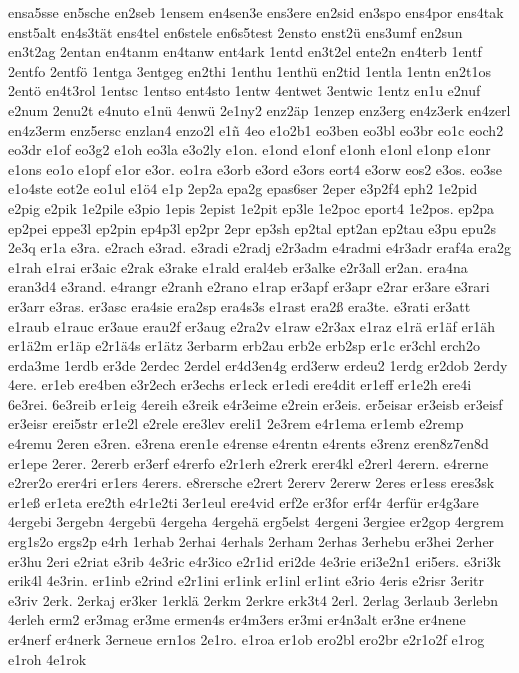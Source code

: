 {ensa5sse
en5sche
en2seb
1ensem
en4sen3e
ens3ere
en2sid
en3spo
ens4por
ens4tak
enst5alt
en4s3tät
ens4tel
en6stele
en6s5test
2ensto
enst2ü
ens3umf
en2sun
en3t2ag
2entan
en4tanm
en4tanw
ent4ark
1entd
en3t2el
ente2n
en4terb
1entf
2entfo
2entfö
1entga
3entgeg
en2thi
1enthu
1enthü
en2tid
1entla
1entn
en2t1os
2entö
en4t3rol
1entsc
1entso
ent4sto
1entw
4entwet
3entwic
1entz
en1u
e2nuf
e2num
2enu2t
e4nuto
e1nü
4enwü
2e1ny2
enz2äp
1enzep
enz3erg
en4z3erk
en4zerl
en4z3erm
enz5ersc
enzlan4
enzo2l
e1ñ
4eo
e1o2b1
eo3ben
eo3bl
eo3br
eo1c
eoch2
eo3dr
e1of
eo3g2
e1oh
eo3la
e3o2ly
e1on.
e1ond
e1onf
e1onh
e1onl
e1onp
e1onr
e1ons
eo1o
e1opf
e1or
e3or.
eo1ra
e3orb
e3ord
e3ors
eort4
e3orw
eos2
e3os.
eo3se
e1o4ste
eot2e
eo1ul
e1ö4
e1p
2ep2a
epa2g
epas6ser
2eper
e3p2f4
eph2
1e2pid
e2pig
e2pik
1e2pile
e3pio
1epis
2epist
1e2pit
ep3le
1e2poc
eport4
1e2pos.
ep2pa
ep2pei
eppe3l
ep2pin
ep4p3l
ep2pr
2epr
ep3sh
ep2tal
ept2an
ep2tau
e3pu
epu2s
2e3q
er1a
e3ra.
e2rach
e3rad.
e3radi
e2radj
e2r3adm
e4radmi
e4r3adr
eraf4a
era2g
e1rah
e1rai
er3aic
e2rak
e3rake
e1rald
eral4eb
er3alke
e2r3all
er2an.
era4na
eran3d4
e3rand.
e4rangr
e2ranh
e2rano
e1rap
er3apf
er3apr
e2rar
er3are
e3rari
er3arr
e3ras.
er3asc
era4sie
era2sp
era4s3s
e1rast
era2ß
era3te.
e3rati
er3att
e1raub
e1rauc
er3aue
erau2f
er3aug
e2ra2v
e1raw
e2r3ax
e1raz
e1rä
er1äf
er1äh
er1ä2m
er1äp
e2r1ä4s
er1ätz
3erbarm
erb2au
erb2e
erb2sp
er1c
er3chl
erch2o
erda3me
1erdb
er3de
2erdec
2erdel
er4d3en4g
erd3erw
erdeu2
1erdg
er2dob
2erdy
4ere.
er1eb
ere4ben
e3r2ech
er3echs
er1eck
er1edi
ere4dit
er1eff
er1e2h
ere4i
6e3rei.
6e3reib
er1eig
4ereih
e3reik
e4r3eime
e2rein
er3eis.
er5eisar
er3eisb
er3eisf
er3eisr
erei5str
er1e2l
e2rele
ere3lev
ereli1
2e3rem
e4r1ema
er1emb
e2remp
e4remu
2eren
e3ren.
e3rena
eren1e
e4rense
e4rentn
e4rents
e3renz
eren8z7en8d
er1epe
2erer.
2ererb
er3erf
e4rerfo
e2r1erh
e2rerk
erer4kl
e2rerl
4erern.
e4rerne
e2rer2o
erer4ri
er1ers
4erers.
e8rersche
e2rert
2ererv
2ererw
2eres
er1ess
eres3sk
er1eß
er1eta
ere2th
e4r1e2ti
3er1eul
ere4vid
erf2e
er3for
erf4r
4erfür
er4g3are
4ergebi
3ergebn
4ergebü
4ergeha
4ergehä
erg5elst
4ergeni
3ergiee
er2gop
4ergrem
erg1s2o
ergs2p
e4rh
1erhab
2erhai
4erhals
2erham
2erhas
3erhebu
er3hei
2erher
er3hu
2eri
e2riat
e3rib
4e3ric
e4r3ico
e2r1id
eri2de
4e3rie
eri3e2n1
eri5ers.
e3ri3k
erik4l
4e3rin.
er1inb
e2rind
e2r1ini
er1ink
er1inl
er1int
e3rio
4eris
e2risr
3eritr
e3riv
2erk.
2erkaj
er3ker
1erklä
2erkm
2erkre
erk3t4
2erl.
2erlag
3erlaub
3erlebn
4erleh
erm2
er3mag
er3me
ermen4s
er4m3ers
er3mi
er4n3alt
er3ne
er4nene
er4nerf
er4nerk
3erneue
ern1os
2e1ro.
e1roa
er1ob
ero2bl
ero2br
e2r1o2f
e1rog
e1roh
4e1rok
}
